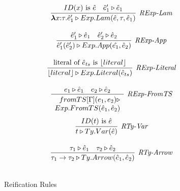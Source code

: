\begin{figure}[t]
\begin{minipage}{.47\textwidth}
\[\begin{array}{c}
\infer[\textit{RExp-Lam}]
	{ \boldsymbol\lambda x{:}\tau . \hat{e}'_1 \triangleright Exp.Lam( \hat{e}, \tau, \hat{e}_1 )  }
	{ID(x)\ \text{is}\ \hat{e} & \hat{e}'_1 \triangleright \hat{e}_1  } \\[3ex]

\infer[\textit{RExp-App}]
	{ \hat{e}'_1(\hat{e}'_2)  \triangleright Exp.App(\hat{e_1},\hat{e}_2) }
	{ \hat{e}'_1 \triangleright \hat{e}_1  & \hat{e}'_2 \triangleright \hat{e}_2   } \\[3ex]

\infer[\textit{RExp-Literal}]
	{ \lfloor literal \rfloor \triangleright Exp.Literal( \hat{e}_{ts} )  }
	{ \text{literal of}\ \hat{e}_{ts}\ \text{is}\ \lfloor literal \rfloor  } \\[3ex]

\infer[\textit{RExp-FromTS}]
          {\renewcommand{\arraystretch}{1}
	    \begin{array}{r}
	    fromTS[\Gamma](e_1,e_2) \triangleright\\
           Exp.FromTS(\hat{e}_1,\hat{e}_2)
            \end{array}
       }
	  {e_1 \triangleright \hat{e}_1 & e_2 \triangleright \hat{e}_2  }
	   \\[3ex] 

\infer[\textit{RTy-Var}]
	{ t \triangleright Ty.Var(\hat{e})   }
	{ ID(t)\ \text{is}\ \hat{e}} \\[3ex]

\infer[\textit{RTy-Arrow}]
	{ \tau_1 \rightarrow \tau_2 \triangleright Ty.Arrow(\hat{e}_1,\hat{e}_2 )  }
	{ \tau_1 \triangleright \hat{e}_1 & \tau_2 \triangleright \hat{e}_2 } \\[3ex]
\end{array}
\]
\label{fig:reification}
\caption{Reification Rules}
\end{minipage}
\end{figure}

